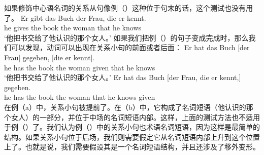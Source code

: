 \noindent
如果修饰中心语名词的关系从句像例（）这种位于句末的话，这个测试也没有用了。
\ea
\gll Er gibt das Buch der Frau, die er kennt.\\
      he gives the book the woman that he knows\\
\glt `他把书交给了他认识的那个女人。'
\z
如果我们把例（）的句子变成完成时，那么我们可以发现，动词可以出现在关系小句的前面或者后面：
\eal
\ex 
\gll Er hat das Buch [der Frau] gegeben, [die er kennt].\\
     he has the book \spacebr{}the woman given \spacebr{}that he knows\\
\glt `他把书交给了他认识的那个女人。'
\ex 
\gll Er hat das Buch [der Frau, die er kennt,] gegeben.\\
	 he has the book \spacebr{}the woman that he knows given\\
\zl
在例（a）中，关系小句被提前了。在（b）中，它构成了名词短语（他认识的那个女人）的一部分，并位于中场的名词短语内部。这样，上面的测试方法也不适用于例（）了。我们认为例（）中的关系小句也术语名词短语，因为这样是最简单的结构。如果关系小句位于后场，我们则需要假定它从名词短语内部上升到这个位置上了。也就是说，我们需要假设其是一个名词短语结构，并且还涉及了移外变形。
%

